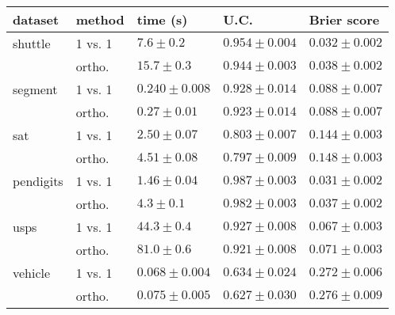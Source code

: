 \begin{tabular}{|ll|lll|}
\hline
dataset & method & time (s) & U.C. & Brier score \\
\hline\hline
shuttle & 1 vs. 1 & $       7.6\pm     0.2$ & $     0.954\pm   0.004$ & $   0.032\pm   0.002$ \\
& ortho. & $     15.7\pm     0.3$ & $     0.944\pm   0.003$ & $   0.038\pm   0.002$\\
\hline
segment & 1 vs. 1 & $        0.240\pm   0.008$ & $    0.928\pm    0.014$ & $    0.088\pm   0.007$ \\
& ortho. & $        0.27\pm   0.01$ & $     0.923\pm    0.014$ & $   0.088\pm    0.007$\\
\hline
sat & 1 vs. 1 & $       2.50\pm    0.07$ & $     0.803\pm   0.007$ & $    0.144\pm   0.003$ \\
& ortho. & $      4.51\pm    0.08$ & $    0.797\pm   0.009$ & $    0.148\pm   0.003$\\
\hline
pendigits & 1 vs. 1 & $      1.46\pm    0.04$ & $     0.987\pm   0.003$ & $   0.031\pm   0.002$ \\
 & ortho. & $      4.3\pm      0.1$ & $     0.982\pm   0.003$ & $   0.037\pm   0.002$\\
\hline
usps & 1 vs. 1 & $        44.3\pm     0.4$ & $     0.927\pm   0.008$ & $   0.067\pm   0.003$ \\
& ortho. & $      81.0\pm     0.6$ & $      0.921\pm   0.008$ & $   0.071\pm   0.003$\\
\hline
vehicle & 1 vs. 1 & $      0.068\pm   0.004$ & $    0.634\pm    0.024$ & $    0.272\pm   0.006$ \\
& ortho. & $      0.075\pm   0.005$ & $    0.627\pm     0.030$ & $    0.276\pm   0.009$\\
\hline
\end{tabular}

